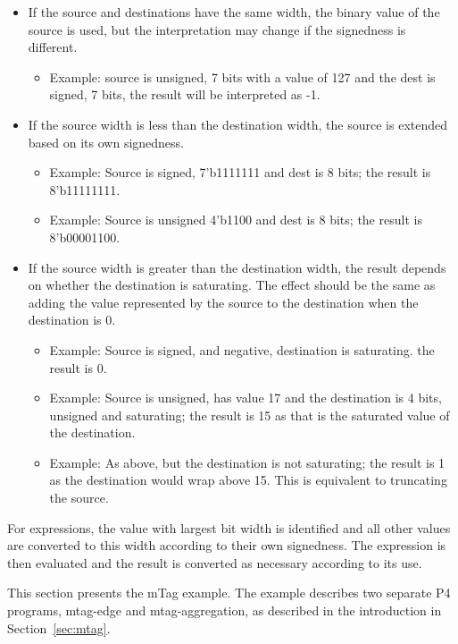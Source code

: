 \documentclass[12pt]{article}
\begin{document}
\begin{itemize}
\item
If the source and destinations have the same width, the binary value
of the source is used, but the interpretation may change if the
signedness is different.
\begin{itemize}
\item
Example: source is unsigned, 7 bits with a value of 127 and the dest
is signed, 7 bits, the result will be interpreted as -1.
\end{itemize}
\item
If the source width is less than the destination width, the source is
extended based on its own signedness.
\begin{itemize}
\item
Example: Source is signed, 7'b1111111 and dest is 8 bits; the result is 
8'b11111111.
\item
Example: Source is unsigned 4'b1100 and dest is 8 bits; the result is
8'b00001100.
\end{itemize}
\item
If the source width is greater than the destination width, the result
depends on whether the destination is saturating.  The effect should
be the same as adding the value represented by the source to the
destination when the destination is 0.
\begin{itemize}
\item
Example: Source is signed, and negative, destination is
saturating. the result is 0.
\item
Example: Source is unsigned, has value 17 and the destination is 4
bits, unsigned and saturating; the result is 15 as that is the
saturated value of the destination.
\item
Example: As above, but the destination is not saturating; the result is 1 
as the destination would wrap above 15. This is equivalent to truncating the 
source.
\end{itemize}
\end{itemize}


For expressions, the value with largest bit width is identified and
all other values are converted to this width according to their own
signedness.  The expression is then evaluated and the result is
converted as necessary according to its use.



This section presents the mTag example. The example describes two separate 
P4 programs, mtag-edge and mtag-aggregation, as described in the introduction 
in Section~\ref{sec:mtag}.
\end{document}
